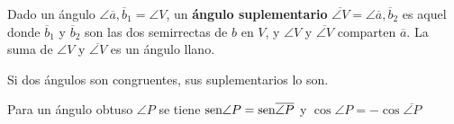  Dado un ángulo $\angle{\overline{a}, \overline{b}_1} = \angle V$, un \textbf{ángulo suplementario} $\overline{\angle V} = \angle{\overline{a}, \overline{b}_2}$ es aquel donde $\overline{b}_1$ y $\overline{b}_2$ son las dos semirrectas de $b$ en $V$, y $\angle V$ y $\overline{\angle V}$ comparten $\overline{a}$. La suma de $\angle V$ y $\overline{\angle V}$ es un ángulo llano.

 Si dos ángulos son congruentes, sus suplementarios lo son.

 Para un ángulo obtuso $\angle P$ se tiene $\text{sen} \angle P = \text{sen} \overline{\angle P}$ y $\cos \angle P = -\cos \overline{\angle P}$


